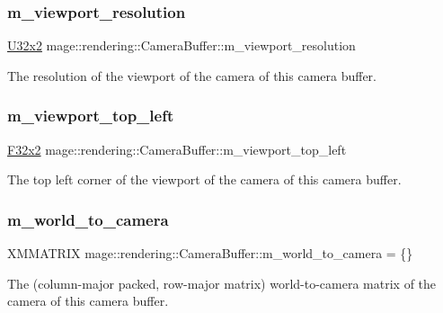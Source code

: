 \subsubsection{\texorpdfstring{m\+\_\+viewport\+\_\+resolution}{m\_viewport\_resolution}}
{\footnotesize\ttfamily \mbox{\hyperlink{namespacemage_ae5e7ccf8a1785baaacf57b3a0f4324e2}{U32x2}} mage\+::rendering\+::\+Camera\+Buffer\+::m\+\_\+viewport\+\_\+resolution}

The resolution of the viewport of the camera of this camera buffer. \mbox{\label{structmage_1_1rendering_1_1_camera_buffer_a074146702a680ce9102dd9cf84e74be3}} 
\subsubsection{\texorpdfstring{m\+\_\+viewport\+\_\+top\+\_\+left}{m\_viewport\_top\_left}}
{\footnotesize\ttfamily \mbox{\hyperlink{namespacemage_aee4759dedc8def6c6dec26b5c7eddf29}{F32x2}} mage\+::rendering\+::\+Camera\+Buffer\+::m\+\_\+viewport\+\_\+top\+\_\+left}

The top left corner of the viewport of the camera of this camera buffer. \mbox{\label{structmage_1_1rendering_1_1_camera_buffer_af1ceff883dcc383ce10f2165a5a9a061}} 
\subsubsection{\texorpdfstring{m\+\_\+world\+\_\+to\+\_\+camera}{m\_world\_to\_camera}}
{\footnotesize\ttfamily X\+M\+M\+A\+T\+R\+IX mage\+::rendering\+::\+Camera\+Buffer\+::m\+\_\+world\+\_\+to\+\_\+camera = \{\}}

The (column-\/major packed, row-\/major matrix) world-\/to-\/camera matrix of the camera of this camera buffer. 